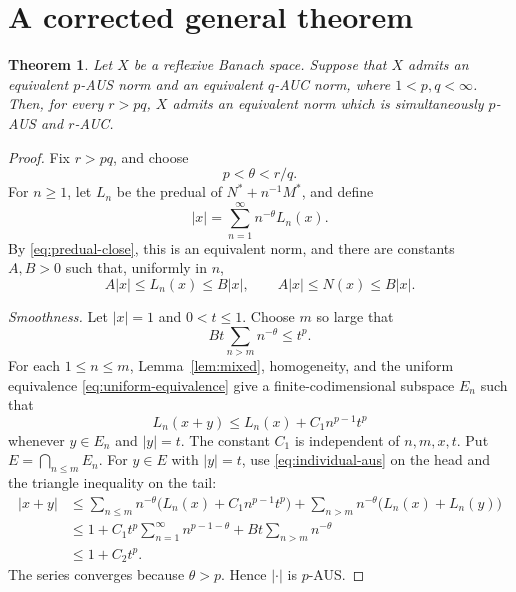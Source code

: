 \documentclass[11pt]{article}
\newtheorem{theorem}{Theorem}[section]
\theoremstyle{definition}
\theoremstyle{remark}
\newcommand{\absnorm}[1]{\left\lvert #1\right\rvert}
\begin{document}
\section{A corrected general theorem}

\begin{theorem}\label{thm:corrected}
Let \(X\) be a reflexive Banach space.  Suppose that \(X\) admits an
equivalent \(p\)-AUS norm and an equivalent \(q\)-AUC norm, where
\(1<p,q<\infty\).  Then, for every \(r>pq\), \(X\) admits an equivalent norm
which is simultaneously \(p\)-AUS and \(r\)-AUC.
\end{theorem}

\begin{proof}
Fix \(r>pq\), and choose
\begin{equation}\label{eq:theta-choice}
 p<\theta<r/q.
\end{equation}
For \(n\ge1\), let \(L_n\) be the predual of
\(N^*+n^{-1}M^*\), and define
\begin{equation}\label{eq:averaged-norm}
 \absnorm{x}=\sum_{n=1}^\infty n^{-\theta}L_n(x).
\end{equation}
By \eqref{eq:predual-close}, this is an equivalent norm, and there are
constants \(A,B>0\) such that, uniformly in \(n\),
\begin{equation}\label{eq:uniform-equivalence}
 A\absnorm{x}\le L_n(x)\le B\absnorm{x},\qquad
 A\absnorm{x}\le N(x)\le B\absnorm{x}.
\end{equation}

\medskip
\noindent\emph{Smoothness.}
Let \(\absnorm{x}=1\) and \(0<t\le1\).  Choose \(m\) so large that
\begin{equation}\label{eq:tail-choice}
 Bt\sum_{n>m}n^{-\theta}\le t^p.
\end{equation}
For each \(1\le n\le m\), Lemma~\ref{lem:mixed}, homogeneity, and the
uniform equivalence \eqref{eq:uniform-equivalence} give a
finite-codimensional subspace \(E_n\) such that
\begin{equation}\label{eq:individual-aus}
 L_n(x+y)\le L_n(x)+C_1n^{p-1}t^p
\end{equation}
whenever \(y\in E_n\) and \(\absnorm{y}=t\).  The constant \(C_1\) is
independent of \(n,m,x,t\).  Put \(E=\bigcap_{n\le m}E_n\).  For
\(y\in E\) with \(\absnorm{y}=t\), use \eqref{eq:individual-aus} on the
head and the triangle inequality on the tail:
\begin{align*}
 \absnorm{x+y}
 &\le \sum_{n\le m}n^{-\theta}
       \bigl(L_n(x)+C_1n^{p-1}t^p\bigr)
      +\sum_{n>m}n^{-\theta}\bigl(L_n(x)+L_n(y)\bigr)\\
 &\le 1+C_1t^p\sum_{n=1}^\infty n^{p-1-\theta}
      +Bt\sum_{n>m}n^{-\theta}\\
 &\le 1+C_2t^p.
\end{align*}
The series converges because \(\theta>p\).  Hence \(\absnorm{\cdot}\) is
\(p\)-AUS.


\end{proof}
\end{document}
